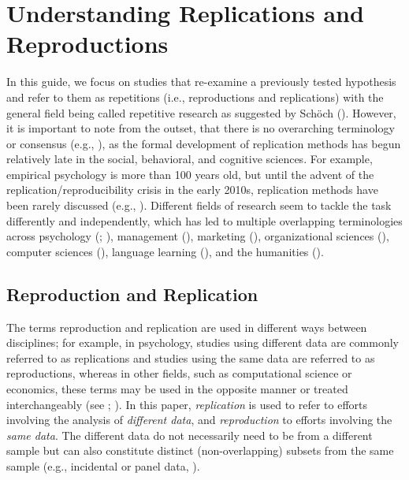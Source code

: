 \documentclass[
  letterpaper,
  DIV=11,
  openany,
  fontsize=12pt,
  parskip=half,
  headings=big,
  numbers=noenddot,
  titlepage=false]{scrreprt}
\begin{document}
\chapter{Understanding Replications and
Reproductions}\label{understanding-replications-and-reproductions}

In this guide, we focus on studies that re-examine a previously tested
hypothesis and refer to them as repetitions (i.e., reproductions and
replications) with the general field being called repetitive research as
suggested by Schöch (). However, it is
important to note from the outset, that there is no overarching
terminology or consensus (e.g., ), as the formal development of replication methods has begun
relatively late in the social, behavioral, and cognitive sciences. For
example, empirical psychology is more than 100 years old, but until the
advent of the replication/reproducibility crisis in the early 2010s,
replication methods have been rarely discussed (e.g.,
). Different fields of research seem
to tackle the task differently and independently, which has led to
multiple overlapping terminologies across psychology
(;
),
management (),
marketing (), organizational sciences (), computer sciences
(), language learning
(), and the humanities
().

\section{Reproduction and
Replication}\label{reproduction-and-replication}

The terms reproduction and replication are used in different ways
between disciplines; for example, in psychology, studies using different
data are commonly referred to as replications and studies using the same
data are referred to as reproductions, whereas in other fields, such as
computational science or economics, these terms may be used in the
opposite manner or treated interchangeably (see
;
). In this paper, \emph{replication} is used to refer to efforts
involving the analysis of \emph{different data}, and \emph{reproduction}
to efforts involving the \emph{same data}. The different data do not
necessarily need to be from a different sample but can also constitute
distinct (non-overlapping) subsets from the same sample (e.g.,
incidental or panel data, ).
\end{document}

